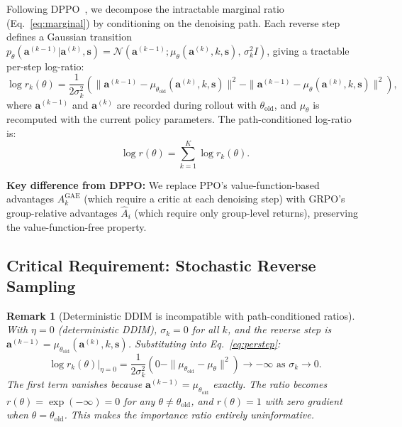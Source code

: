 \documentclass{article}
\newtheorem{remark}{Remark}
\newcommand{\ba}{\mathbf{a}}
\newcommand{\bs}{\mathbf{s}}
\begin{document}
Following DPPO~\cite{ren2024dppo}, we decompose the intractable marginal ratio (Eq.~\ref{eq:marginal}) by conditioning on the denoising path.
Each reverse step defines a Gaussian transition $p_\theta(\ba^{(k-1)} | \ba^{(k)}, \bs) = \mathcal{N}(\ba^{(k-1)}; \mu_\theta(\ba^{(k)}, k, \bs),\, \sigma_k^2 I)$, giving a tractable per-step log-ratio:
\begin{equation}
\label{eq:perstep}
\log r_k(\theta) = \frac{1}{2\sigma_k^2}\left(\|\ba^{(k-1)} - \mu_{\theta_\text{old}}(\ba^{(k)}, k, \bs)\|^2 - \|\ba^{(k-1)} - \mu_\theta(\ba^{(k)}, k, \bs)\|^2\right),
\end{equation}
where $\ba^{(k-1)}$ and $\ba^{(k)}$ are recorded during rollout with $\theta_\text{old}$, and $\mu_\theta$ is recomputed with the current policy parameters.
The path-conditioned log-ratio is:
\begin{equation}
\label{eq:pathratio}
\log r(\theta) = \sum_{k=1}^{K} \log r_k(\theta).
\end{equation}

\noindent\textbf{Key difference from DPPO:} We replace PPO's value-function-based advantages $A^{\text{GAE}}_k$ (which require a critic at each denoising step) with GRPO's group-relative advantages $\hat{A}_i$ (which require only group-level returns), preserving the value-function-free property.

\subsection{Critical Requirement: Stochastic Reverse Sampling}
\label{sec:stochastic}

\begin{remark}[Deterministic DDIM is incompatible with path-conditioned ratios]
\label{rem:det}
With $\eta = 0$ (deterministic DDIM), $\sigma_k = 0$ for all $k$, and the reverse step is $\ba^{(k-1)} = \mu_{\theta_\text{old}}(\ba^{(k)}, k, \bs)$.
Substituting into Eq.~\ref{eq:perstep}:
\begin{equation}
\log r_k(\theta)\big|_{\eta=0} = \frac{1}{2\sigma_k^2}\left(0 - \|\mu_{\theta_\text{old}} - \mu_\theta\|^2\right) \to -\infty \text{ as } \sigma_k \to 0.
\end{equation}
The first term vanishes because $\ba^{(k-1)} = \mu_{\theta_\text{old}}$ exactly.
The ratio becomes $r(\theta) = \exp(-\infty) = 0$ for any $\theta \neq \theta_\text{old}$, and $r(\theta) = 1$ with zero gradient when $\theta = \theta_\text{old}$.
This makes the importance ratio entirely uninformative.
\end{remark}
\end{document}
